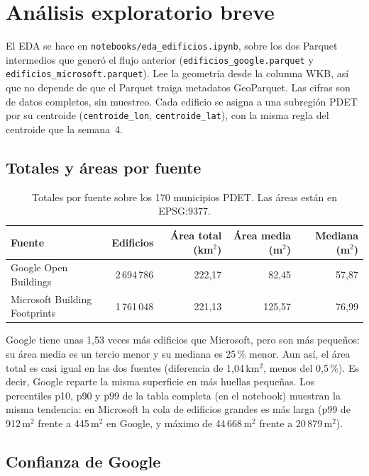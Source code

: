 \documentclass[11pt,a4paper]{article}
\newcommand{\campo}[1]{\texttt{#1}}
\begin{document}
\section{Análisis exploratorio breve}
\label{sec:eda}

El EDA se hace en \campo{notebooks/eda\_edificios.ipynb}, sobre los dos Parquet
intermedios que generó el flujo anterior (\campo{edificios\_google.parquet} y
\campo{edificios\_microsoft.parquet}). Lee la geometría desde la columna WKB, así
que no depende de que el Parquet traiga metadatos GeoParquet. Las cifras son de
datos completos, sin muestreo. Cada edificio se asigna a una subregión PDET por
su centroide (\campo{centroide\_lon}, \campo{centroide\_lat}), con la misma regla
del centroide que la semana~4.

\subsection{Totales y áreas por fuente}

\begin{table}[H]
\centering\small
\begin{tabularx}{\textwidth}{@{}Lrrrr@{}}
\toprule
\textbf{Fuente} & \textbf{Edificios} & \textbf{Área total (km$^2$)} & \textbf{Área media (m$^2$)} & \textbf{Mediana (m$^2$)} \\
\midrule
Google Open Buildings & 2\,694\,786 & 222,17 & 82,45 & 57,87 \\
Microsoft Building Footprints & 1\,761\,048 & 221,13 & 125,57 & 76,99 \\
\bottomrule
\end{tabularx}
\caption{Totales por fuente sobre los 170 municipios PDET. Las áreas están en EPSG:9377.}
\label{tab:eda-totales}
\end{table}

Google tiene unas 1,53 veces más edificios que Microsoft, pero son más pequeños:
su área media es un tercio menor y su mediana es 25\,\% menor. Aun así, el área
total es casi igual en las dos fuentes (diferencia de 1,04\,km$^2$, menos del
0,5\,\%). Es decir, Google reparte la misma superficie en más huellas pequeñas.
Los percentiles p10, p90 y p99 de la tabla completa (en el notebook) muestran la
misma tendencia: en Microsoft la cola de edificios grandes es más larga (p99 de
912\,m$^2$ frente a 445\,m$^2$ en Google, y máximo de 44\,668\,m$^2$ frente a
20\,879\,m$^2$).

\subsection{Confianza de Google}
\end{document}
